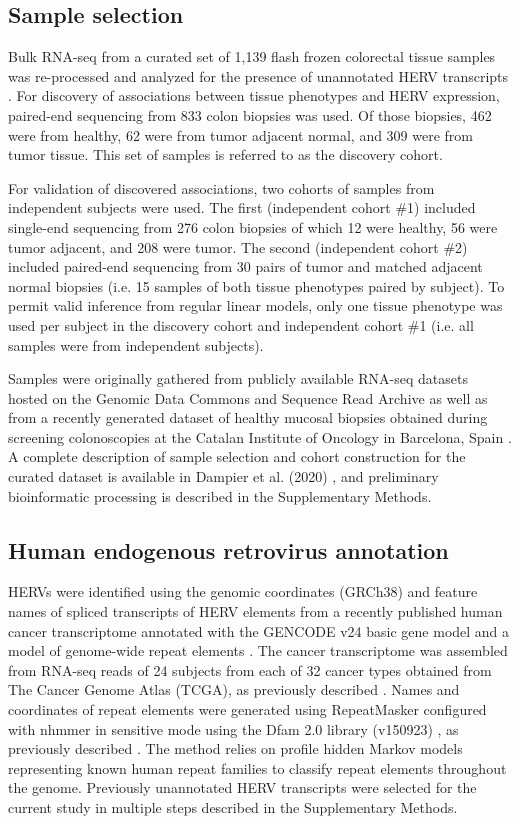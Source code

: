\subsection*{Sample selection}
Bulk RNA-seq from a curated set of 1,139 flash frozen colorectal tissue samples was re-processed and analyzed for the presence of unannotated HERV transcripts \citep{Dampier2020}.
For discovery of associations between tissue phenotypes and HERV expression, paired-end sequencing from 833 colon biopsies was used.
Of those biopsies, 462 were from healthy, 62 were from tumor adjacent normal, and 309 were from tumor tissue.
This set of samples is referred to as the discovery cohort.

For validation of discovered associations, two cohorts of samples from independent subjects were used.
The first (independent cohort \#1) included single-end sequencing from 276 colon biopsies of which 12 were healthy, 56 were tumor adjacent, and 208 were tumor.
The second (independent cohort \#2) included paired-end sequencing from 30 pairs of tumor and matched adjacent normal biopsies (i.e. 15 samples of both tissue phenotypes paired by subject).
To permit valid inference from regular linear models, only one tissue phenotype was used per subject in the discovery cohort and independent cohort \#1 (i.e. all samples were from independent subjects).

Samples were originally gathered from publicly available RNA-seq datasets hosted on the Genomic Data Commons and Sequence Read Archive as well as from a recently generated dataset of healthy mucosal biopsies obtained during screening colonoscopies at the Catalan Institute of Oncology in Barcelona, Spain \citep{Dampier2020, DiezObrero2020}.
A complete description of sample selection and cohort construction for the curated dataset is available in Dampier et al. (2020) \citep{Dampier2020}, and preliminary bioinformatic processing is described in the Supplementary Methods.

\subsection*{Human endogenous retrovirus annotation}
HERVs were identified using the genomic coordinates (GRCh38) and feature names of spliced transcripts of HERV elements from a recently published human cancer transcriptome annotated with the GENCODE v24 basic gene model \citep{Frankish2018} and a model of genome-wide repeat elements \citep{Attig2019}.
The cancer transcriptome was assembled from RNA-seq reads of 24 subjects from each of 32 cancer types obtained from The Cancer Genome Atlas (TCGA), as previously described \citep{Attig2019}.
Names and coordinates of repeat elements were generated using RepeatMasker \citep{Smit2015} configured with nhmmer \citep{Wheeler2013} in sensitive mode using the Dfam 2.0 library (v150923) \citep{Hubley2015}, as previously described \citep{Attig2017}.
The method relies on profile hidden Markov models representing known human repeat families to classify repeat elements throughout the genome.
Previously unannotated HERV transcripts were selected for the current study in multiple steps described in the Supplementary Methods.

